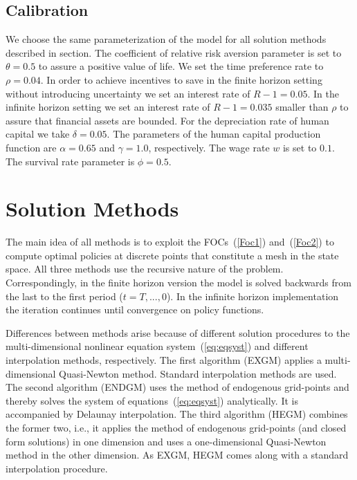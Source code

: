 \documentclass[a4paper,12pt]{article}%
\begin{document}
\subsection{Calibration}

We choose the same parameterization of the model for all solution methods described in section. The coefficient of relative risk aversion parameter is set to $\theta=0.5$ to assure a positive value of life. We set the time preference rate to $\rho=0.04$. In order to achieve incentives to save in the finite horizon setting without introducing uncertainty we set an interest rate of $R-1=0.05$. In the infinite horizon setting we set an interest rate of $R-1=0.035$ smaller than $\rho$ to assure that financial assets are bounded. For the depreciation rate of human capital we take $\delta=0.05.$ The parameters of the human capital production function are $\alpha=0.65$ and $\gamma=1.0$, respectively. The wage rate $w$ is set to $0.1$. The survival rate parameter is $\phi=0.5$.

\section{Solution Methods}

The main idea of all methods is to exploit the FOCs~(\ref{Foc1}) and~(\ref{Foc2}) to compute optimal policies at discrete points that constitute a mesh in the state space. All three methods use the recursive nature of the problem. Correspondingly, in the finite horizon version the model is solved backwards from the last to the first period ($t=T,...,0$). In the infinite horizon implementation the iteration continues until convergence on policy functions.

Differences between methods arise because of different solution procedures to the multi-dimensional nonlinear equation system~(\ref{eq:eqsyst}) and different interpolation methods, respectively. The first algorithm (EXGM) applies a multi-dimensional Quasi-Newton method. Standard interpolation methods are used. The second algorithm (ENDGM) uses the method of endogenous grid-points and thereby solves the system of equations~(\ref{eq:eqsyst}) analytically. It is accompanied by Delaunay interpolation. The third algorithm (HEGM) combines the former two, i.e., it applies the method of endogenous grid-points (and closed form solutions) in one dimension and uses a one-dimensional Quasi-Newton method in the other dimension. As EXGM, HEGM comes along with a standard interpolation procedure.
\end{document}
